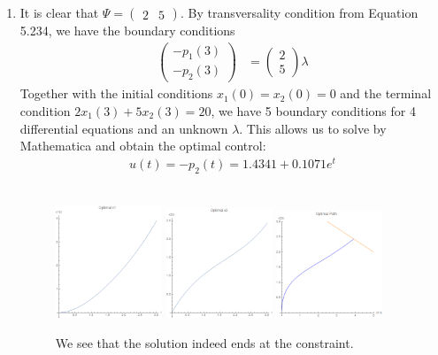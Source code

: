 \documentclass[12pt]{article}
\begin{document}
\begin{problem}[1]
\begin{enumerate}[label=(\alph*)]
\item It is clear that $ \Psi = \begin{pmatrix} 2&5 \end{pmatrix} $. By transversality condition from Equation 5.234, we have the boundary conditions
\begin{align*}
	\begin{pmatrix} -p_1(3)\\-p_2(3) \end{pmatrix} &= \begin{pmatrix} 2\\5 \end{pmatrix} \lambda 
\end{align*}
Together with the initial conditions $ x_1(0)=x_2(0)=0$ and the terminal condition $ 2 x_1(3) + 5x_2(3) = 20$, we have 5 boundary conditions for 4 differential equations and an unknown $ \lambda$. This allows us to solve by Mathematica and obtain the optimal control:
\begin{align*}
	u(t)=-p_2(t)= 1.4341+0.1071 e^{t}
\end{align*}
~\begin{figure}[H]
	\centering
	\includegraphics[width=0.3\textwidth]{./figures/4.12.png}
	\includegraphics[width=0.3\textwidth]{./figures/4.13.png}
	\includegraphics[width=0.3\textwidth]{./figures/4.14.png}
	\caption{We see that the solution indeed ends at the constraint.}
\end{figure}


\end{enumerate}
\end{problem}
\end{document}
